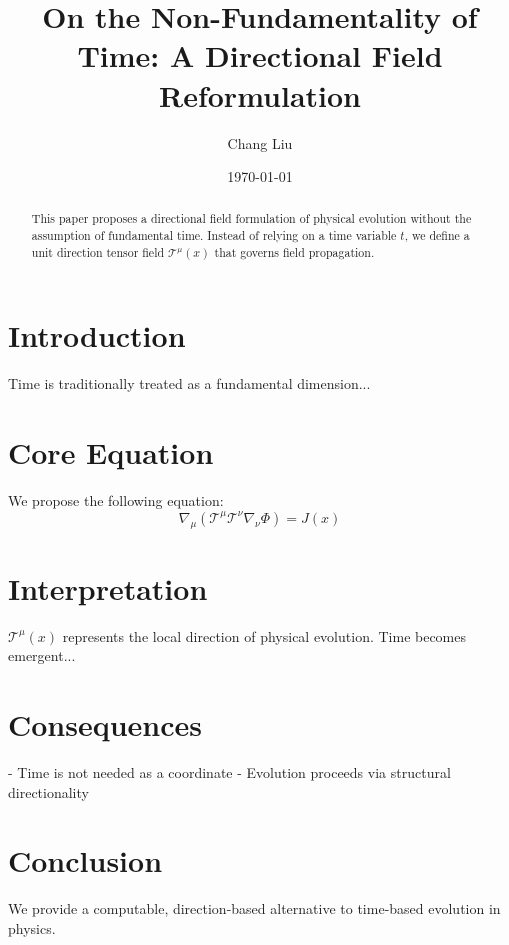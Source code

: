 \documentclass[12pt]{article}
\title{On the Non-Fundamentality of Time: A Directional Field Reformulation}
\author{Chang Liu}
\date{\today}
\begin{document}
\maketitle

\begin{abstract}
This paper proposes a directional field formulation of physical evolution without the assumption of fundamental time. Instead of relying on a time variable $t$, we define a unit direction tensor field $\mathcal{T}^\mu(x)$ that governs field propagation.
\end{abstract}

\section{Introduction}
Time is traditionally treated as a fundamental dimension...

\section{Core Equation}
We propose the following equation:
\[
\nabla_\mu \left( \mathcal{T}^\mu \mathcal{T}^\nu \nabla_\nu \Phi \right) = J(x)
\]

\section{Interpretation}
$\mathcal{T}^\mu(x)$ represents the local direction of physical evolution. Time becomes emergent...

\section{Consequences}
- Time is not needed as a coordinate
- Evolution proceeds via structural directionality

\section{Conclusion}
We provide a computable, direction-based alternative to time-based evolution in physics.
\end{document}
